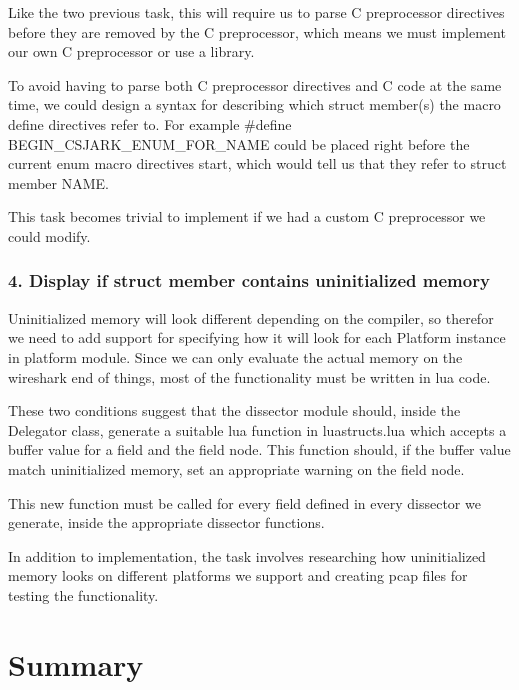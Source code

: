 Like the two previous task, this will require us to parse C preprocessor directives before they are removed by the C preprocessor, which means we must implement our own C preprocessor or use a library.

To avoid having to parse both C preprocessor directives and C code at the same time, we could design a syntax for describing which struct member(s) the macro define directives refer to. For example \#define BEGIN\_CSJARK\_ENUM\_FOR\_NAME could be placed right before the current enum macro directives start, which would tell us that they refer to struct member NAME.

This task becomes trivial to implement if we had a custom C preprocessor we could modify.

\subsubsection{4. Display if struct member contains uninitialized memory}
Uninitialized memory will look different depending on the compiler, so therefor we need to add support for specifying how it will look for each Platform instance in platform module. Since we can only evaluate the actual memory on the wireshark end of things, most of the functionality must be written in lua code.

These two conditions suggest that the dissector module should, inside the Delegator class, generate a suitable lua function in luastructs.lua which accepts a buffer value for a field and the field node. This function should, if the buffer value match uninitialized memory,  set an appropriate warning on the field node.

This new function must be called for every field defined in every dissector we generate, inside the appropriate dissector functions.

In addition to implementation, the task involves researching how uninitialized memory looks on different platforms we support and creating pcap files for testing the functionality.



\section{Summary}
